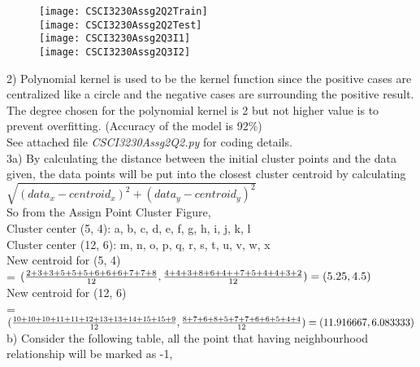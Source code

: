 \documentclass[12pt]{article}
\begin{document}
\newpage
{}
\begin{wrapfigure}[13]{r}{0.5\textwidth}
\texttt{[image: CSCI3230Assg2Q2Train]}\\
\texttt{[image: CSCI3230Assg2Q2Test]}\\
\texttt{[image: CSCI3230Assg2Q3I1]}\\
\texttt{[image: CSCI3230Assg2Q3I2]}\\
\end{wrapfigure}
2) Polynomial kernel is used to be the kernel function since the positive cases are centralized like a circle and the negative cases are surrounding the positive result. The degree chosen for the polynomial kernel is 2 but not higher value is to prevent overfitting. (Accuracy of the model is  92\%)\\[0.2in]
See attached file \textit{CSCI3230Assg2Q2.py} for coding details.\\[3.2in]
3a) By calculating the distance between the initial cluster points and the data given, the data points will be put into the closest cluster centroid by calculating \\$\sqrt{(data_{x} - centroid_{x})^{2} + (data_{y} - centroid_{y})^{2}}$\\So from the Assign Point Cluster Figure,\\
Cluster center (5, 4): a, b, c, d, e, f, g, h, i, j, k, l\\
Cluster center (12, 6): m, n, o, p, q, r, s, t, u, v, w, x\\
New centroid for (5, 4) \\= $(\frac{2+3+3+5+5+5+6+6+6+7+7+8}{12}, \frac{4+4+3+8+6+4++7+5+4+4+3+2}{12})\\=(5.25, 4.5)$\\
New centroid for (12, 6) \\= $(\frac{10+10+10+11+11+12+13+13+14+15+15+9}{12},\\ \frac{8+7+6+8+5+7+7+6+6+5+4+4}{12})\\=(11.916667, 6.083333)$\newpage b) Consider the following table, all the point that having neighbourhood relationship will be marked as -1,\\
\end{document}
